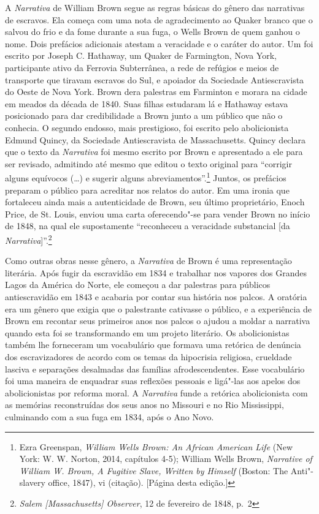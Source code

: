 A \emph{Narrativa} de William Brown segue as regras básicas do gênero
das narrativas de escravos. Ela começa com uma nota de agradecimento ao
Quaker branco que o salvou do frio e da fome durante a sua fuga, o Wells %
Brown de quem ganhou o nome. Dois prefácios adicionais atestam a
veracidade e o caráter do autor. Um foi escrito por Joseph C. Hathaway,
um Quaker de Farmington, Nova York, participante ativo da Ferrovia
Subterrânea, a rede de refúgios e meios de transporte que tiravam
escravos do Sul, e apoiador da Sociedade Antiescravista do Oeste de Nova
York. Brown dera palestras em Farminton e morara na cidade em meados da
década de 1840. Suas filhas estudaram lá e Hathaway estava posicionado
para dar credibilidade a Brown junto a um público que não o conhecia. O
segundo endosso, mais prestigioso, foi escrito pelo abolicionista Edmund
Quincy, da Sociedade Antiescravista de Massachusetts. Quincy declara que
o texto da \emph{Narrativa} foi mesmo escrito por Brown e apresentado a
ele para ser revisado, admitindo até mesmo que editou o texto original
para ``corrigir alguns equívocos (\ldots{}) e sugerir alguns
abreviamentos''.\footnote{Ezra Greenspan, \emph{William Wells Brown: An
  African American Life} (New York: W. W. Norton, 2014, capítulos 4-5);
  William Wells Brown, \emph{Narrative of William W. Brown, A Fugitive
  Slave, Written by Himself} (Boston: The Anti"-slavery office, 1847), vi
  (citação). {[}Página \pageref{ref1} desta edição.{]}} Juntos, os prefácios
preparam o público para acreditar nos relatos do autor. Em uma ironia
que fortaleceu ainda mais a autenticidade de Brown, seu último
proprietário, Enoch Price, de St. Louis, enviou uma carta oferecendo"-se
para vender Brown no início de 1848, na qual ele supostamente
``reconheceu a veracidade substancial {[}da
\emph{Narrativa}{]}''.\footnote{\emph{Salem {[}Massachusetts{]}
  Observer}, 12 de fevereiro de 1848, p.~2}

Como outras obras nesse gênero, a \emph{Narrativa} de Brown é uma
representação literária. Após fugir da escravidão em 1834 e trabalhar
nos vapores dos Grandes Lagos da América do Norte, ele começou a dar
palestras para públicos antiescravidão em 1843 e acabaria por contar sua
história nos palcos. A oratória era um gênero que exigia que o
palestrante cativasse o público, e a experiência de Brown em recontar
seus primeiros anos nos palcos o ajudou a moldar a narrativa quando esta
foi se transformando em um projeto literário. Os abolicionistas também
lhe forneceram um vocabulário que formava uma retórica de denúncia dos
escravizadores de acordo com os temas da hipocrisia religiosa, crueldade
lasciva e separações desalmadas das famílias afrodescendentes. Esse
vocabulário foi uma maneira de enquadrar suas reflexões pessoais e
ligá"-las aos apelos dos abolicionistas por reforma moral. A
\emph{Narrativa} funde a retórica abolicionista com as memórias
reconstruídas dos seus anos no Missouri e no Rio Mississippi, culminando
com a sua fuga em 1834, após o Ano Novo.

